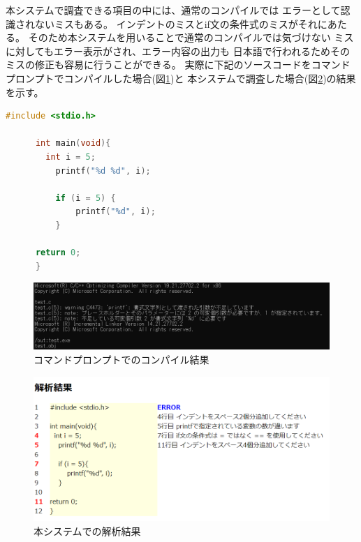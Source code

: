 \documentclass{csspaper}
\begin{document}
      本システムで調査できる項目の中には、通常のコンパイルでは
      エラーとして認識されないミスもある。
      インデントのミスとif文の条件式のミスがそれにあたる。
      そのため本システムを用いることで通常のコンパイルでは気づけない
      ミスに対してもエラー表示がされ、エラー内容の出力も
      日本語で行われるためそのミスの修正も容易に行うことができる。
      実際に下記のソースコードをコマンドプロンプトでコンパイルした場合(図\ref{fig:sys3})と
      本システムで調査した場合(図\ref{fig:sys4})の結果を示す。

      \begin{lstlisting}[language=c]
      #include <stdio.h>
      
      int main(void){
        int i = 5;
          printf("%d %d", i);
      
          if (i = 5) {
              printf("%d", i);
          }
      
      return 0;
      }

      \end{lstlisting}

      \begin{figure}[p]
         \centering
         \includegraphics[width=14cm]{compile1.png}
         \caption{コマンドプロンプトでのコンパイル結果}
         \label{fig:sys3}
      \end{figure}

      \begin{figure}[p]
         \centering
         \includegraphics[width=14cm]{compile2.png}
         \caption{本システムでの解析結果}
         \label{fig:sys4}
      \end{figure}
\end{document}
